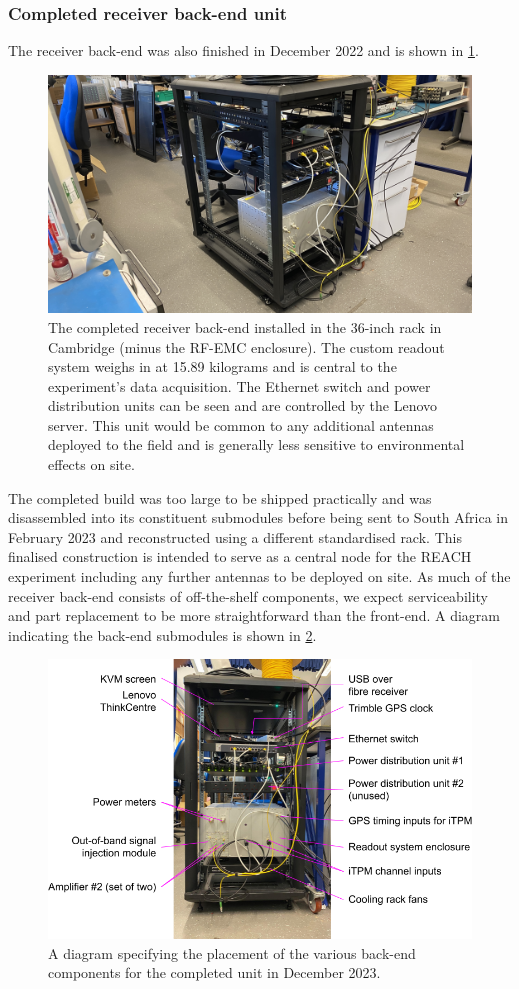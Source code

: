 \subsubsection{Completed receiver back-end unit}
The receiver back-end was also finished in December 2022 and is shown in \cref{fig:backend_complete}.
\begin{figure}
    \centering
    \includegraphics[width=.7\textwidth]{backend_complete}
    \caption{The completed receiver back-end installed in the 36-inch rack in Cambridge (minus the RF-EMC enclosure). The custom readout system weighs in at 15.89 kilograms and is central to the experiment's data acquisition. The Ethernet switch and power distribution units can be seen and are controlled by the Lenovo server. This unit would be common to any additional antennas deployed to the field and is generally less sensitive to environmental effects on site.}
    \label{fig:backend_complete}
\end{figure}
The completed build was too large to be shipped practically and was disassembled into its constituent submodules before being sent to South Africa in February 2023 and reconstructed using a different standardised rack. This finalised construction is intended to serve as a central node for the REACH experiment including any further antennas to be  deployed on site. As much of the receiver back-end consists of off-the-shelf components, we expect serviceability and part replacement to be more straightforward than the front-end. A diagram indicating the back-end submodules is shown in \cref{fig:backend_diag}.
\begin{figure}
    \centering
    \includegraphics[width=\textwidth]{backend_components}
    \caption{A diagram specifying the placement of the various back-end components for the completed unit in December 2023.}
    \label{fig:backend_diag}
\end{figure}


